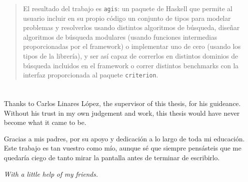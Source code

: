 \begin{abstract}
El resultado del trabajo es \texttt{agis}: un paquete de Haskell que permite al
usuario incluir en su propio código un conjunto de tipos para modelar problemas
y resolverlos usando distintos algoritmos de búsqueda, diseñar algoritmos de
búsqueda modulares (usando funciones intermedias proporcionadas por el
framework) o implementar uno de cero (usando los tipos de la librería), y ser
así capaz de correrlos en distintos dominios de búsqueda incluidos en el
framework o correr distintos benchmarks con la interfaz proporcionada al
paquete \texttt{criterion}.\\
\end{abstract}

\vspace*{\fill}
\newpage



\vspace*{4cm}

\section*{}

Thanks to Carlos Linares López, the supervisor of this thesis, for his
guideance. Without his trust in my own judgement and work, this thesis would
have never become what it came to be.\\


Gracias a mis padres, por su apoyo y dedicación a lo largo de toda mi
educación. Este trabajo es tan vuestro como mío, aunque sé que siempre
pensásteis que me quedaría ciego de tanto mirar la pantalla antes de
terminar de escribirlo.\\

\vspace{1cm}


\centerline{\emph{With a little help of my friends.}}

\newpage

